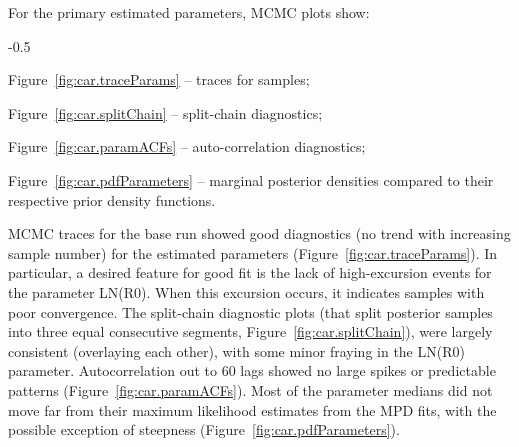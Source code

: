 \documentclass[11pt]{book}
\begin{document}
For the primary estimated parameters, MCMC plots show:
\begin{itemize_csas}{-0.5}{}
\item Figure~\ref{fig:car.traceParams} -- traces for \Nmcmc{} samples;
\item Figure~\ref{fig:car.splitChain} -- split-chain diagnostics;
\item Figure~\ref{fig:car.paramACFs} -- auto-correlation diagnostics;
\item Figure~\ref{fig:car.pdfParameters} -- marginal posterior densities compared to their respective prior density functions.
\end{itemize_csas}

MCMC traces for the base run showed good diagnostics (no trend with increasing sample number) for the estimated parameters (Figure~\ref{fig:car.traceParams}).
In particular, a desired feature for good fit is the lack of high-excursion events for the parameter LN(R0).
When this excursion occurs, it indicates samples with poor convergence.
The split-chain diagnostic plots (that split posterior samples into three equal consecutive segments, Figure~\ref{fig:car.splitChain}), were largely consistent (overlaying each other), with some minor fraying in the LN(R0) parameter.
Autocorrelation out to 60 lags showed no large spikes or predictable patterns (Figure~\ref{fig:car.paramACFs}).
Most of the parameter medians did not move far from their maximum likelihood estimates from the MPD fits, with the possible exception of steepness (Figure~\ref{fig:car.pdfParameters}).



\end{document}
